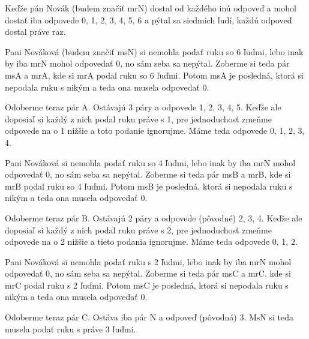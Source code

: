 
Keďže pán Novák (budem značiť mrN) dostal od každého inú odpoveď a 
mohol dostať iba odpovede 0, 1, 2, 3, 4, 5, 6 a pýtal sa siedmich ľudí, 
každú odpoveď dostal práve raz.

Pani Nováková (budem značiť msN) si nemohla podať ruku so 6 ľudmi, lebo 
inak by iba mrN mohol odpovedať 0, no sám seba sa nepýtal. Zoberme si 
teda pár msA a mrA, kde si mrA podal ruku so 6 ľuďmi. Potom msA je 
posledná, ktorá si nepodala ruku s nikým a teda ona musela odpovedať 0. 

Odoberme teraz pár A. Ostávajú 3 páry a odpovede 1, 2, 3, 4, 5. Keďže 
ale doposiaľ si každý z nich podal ruku práve s 1, pre jednoduchosť 
zmeňme odpovede na o 1 nižšie a toto podanie ignorujme. Máme teda 
odpovede 0, 1, 2, 3, 4. 

Pani Nováková si nemohla podať ruku so 4 ľudmi, lebo inak by iba mrN 
mohol odpovedať 0, no sám seba sa nepýtal. Zoberme si teda pár msB a 
mrB, kde si mrB podal ruku so 4 ľuďmi. Potom msB je posledná, ktorá si 
nepodala ruku s nikým a teda ona musela odpovedať 0. 

Odoberme teraz pár B. Ostávajú 2 páry a odpovede (pôvodné) 2, 3, 4. 
Keďže ale doposiaľ si každý z nich podal ruku práve s 2, pre 
jednoduchosť zmeňme odpovede na o 2 nižšie a tieto podania ignorujme. 
Máme teda odpovede 0, 1, 2. 

Pani Nováková si nemohla podať ruku s 2 ľudmi, lebo inak by iba mrN 
mohol odpovedať 0, no sám seba sa nepýtal. Zoberme si teda pár msC a 
mrC, kde si mrC podal ruku s 2 ľuďmi. Potom msC je posledná, ktorá si 
nepodala ruku s nikým a teda ona musela odpovedať 0. 

Odoberme teraz pár C. Ostáva iba pár N a odpoveď (pôvodná) 3. MsN si 
teda musela podať ruku s práve 3 ľuďmi. 

